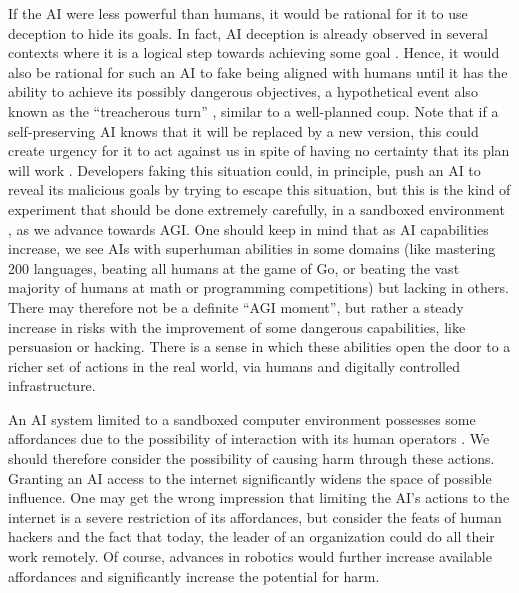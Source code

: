 If the AI were less powerful than humans, it would be rational for it to use deception to hide its goals. In fact, AI deception is already observed in several contexts where it is a logical step towards achieving some goal \cite{arxiv.org.abs.2412.04984,arxiv.org.abs.2405.01576,www.cell.com.patterns.fulltext.S2666.3899.2824.2900103.X.s.08}. Hence, it would also be rational for such an AI to fake being aligned with humans \cite{arxiv.org.abs.2412.14093} until it has the ability to achieve its possibly dangerous objectives, a hypothetical event also known as the ``treacherous turn'' \cite{en.wikipedia.org.wiki.Superintelligence..Paths..Dangers..Strategies,arxiv.org.abs.2306.12001}, similar to a well-planned coup. Note that if a self-preserving AI knows that it will be replaced by a new version, this could create urgency for it to act against us in spite of having no certainty that its plan will work \cite{arxiv.org.abs.2412.04984}. Developers faking this situation could, in principle, push an AI to reveal its malicious goals by trying to escape this situation, but this is the kind of experiment that should be done extremely carefully, in a sandboxed environment \cite{openreview.net.forum.id.GEcwtMk1uA}, as we advance towards AGI. One should keep in mind that as AI capabilities increase, we see AIs with superhuman abilities in some domains (like mastering 200 languages, beating all humans at the game of Go, or beating the vast majority of humans at math or programming competitions) but lacking in others. There may therefore not be a definite ``AGI moment'', but rather a steady increase in risks with the improvement of some dangerous capabilities, like persuasion or hacking. There is a sense in which these abilities open the door to a richer set of actions in the real world, via humans and digitally controlled infrastructure.

An AI system limited to a sandboxed computer environment possesses some affordances due to the possibility of interaction with its human operators \cite{www.yudkowsky.net.singularity.aibox}. We should therefore consider the possibility of causing harm through these actions. Granting an AI access to the internet significantly widens the space of possible influence. One may get the wrong impression that limiting the AI's actions to the internet is a severe restriction of its affordances, but consider the feats of human hackers and the fact that today, the leader of an organization could do all their work remotely. Of course, advances in robotics would further increase available affordances and significantly increase the potential for harm.

